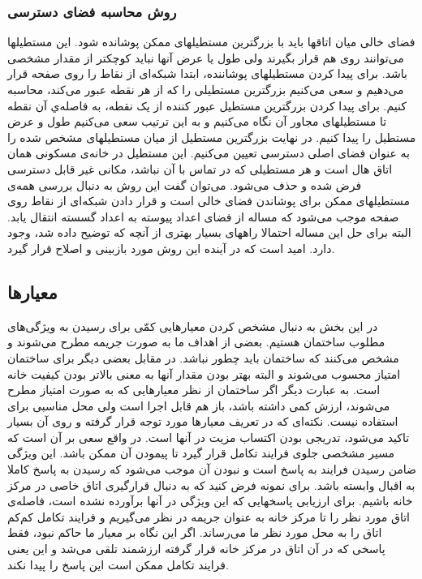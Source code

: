 \documentclass{report}
\begin{document}
\subsubsection{روش محاسبه فضای دسترسی}
فضای خالی میان اتاقها باید با بزرگترین مستطیلهای ممکن پوشانده شود. این مستطیلها می‌توانند روی هم قرار بگیرند ولی طول یا عرض آنها نباید کوچکتر از مقدار مشخصی باشد. برای پیدا کردن مستطیلهای پوشاننده، ابتدا شبکه‌ای از نقاط را روی صفحه قرار می‌دهیم و سعی می‌کنیم بزرگترین مستطیلی را که از هر نقطه عبور می‌کند، محاسبه کنیم. برای پیدا کردن بزرگترین مستطیل عبور کننده از یک نقطه، به فاصله‌ي آن نقطه تا مستطیلهای مجاور آن نگاه می‌کنیم و به این ترتیب سعی می‌کنیم طول و عرض مستطیل را پیدا کنیم.
در نهایت بزرگترین مستطیل از میان مستطیلهای مشخص شده را به عنوان فضای اصلی دسترسی تعیین می‌کنیم. این مستطیل در خانه‌ی مسکونی همان اتاق هال است و هر مستطیلی که در تماس با آن نباشد، مکانی غیر قابل دسترسی فرض شده و حذف می‌شود.
می‌توان گفت این روش به دنبال بررسی همه‌ی مستطیلهای ممکن برای پوشاندن فضای خالی است و قرار دادن شبکه‌ای از نقاط روی صفحه موجب می‌شود که مساله از فضای اعداد پیوسته به اعداد گسسته انتقال یابد. البته برای حل این مساله احتمالا راههای بسیار بهتری از آنچه که توضیح داده شد، وجود دارد. امید است که در آینده این روش مورد بازبینی و اصلاح قرار گیرد.

\subsection{معیارها}
در این بخش به دنبال مشخص کردن معیارهایی کمّی برای رسیدن به ویژگی‌های مطلوب ساختمان هستیم. بعضی از اهداف ما به صورت جریمه مطرح می‌شوند و مشخص می‌کنند که ساختمان باید چطور نباشد. در مقابل بعضی دیگر برای ساختمان امتیاز محسوب می‌شوند و البته بهتر بودن مقدار آنها به معنی بالاتر بودن کیفیت خانه است. به عبارت دیگر اگر ساختمان از نظر معیارهایی که به صورت امتیاز مطرح می‌شوند، ارزش کمی داشته باشد، باز هم قابل اجرا است ولی محل مناسبی برای استفاده نیست.
نکته‌ای که در تعریف معیارها مورد توجه قرار گرفته و روی آن بسیار تاکید می‌شود، تدریجی بودن اکتساب مزیت در آنها است. در واقع سعی بر آن است که مسیر مشخصی جلوی فرایند تکامل قرار گیرد تا پیمودن آن ممکن باشد. این ویژگی ضامن رسیدن فرایند به پاسخ است و نبودن آن موجب می‌شود که رسیدن به پاسخ کاملا به اقبال وابسته باشد. برای نمونه فرض کنید که به دنبال قرارگیری اتاق خاصی در مرکز خانه باشیم. برای ارزیابی پاسخهایی که این ویژگی در آنها برآورده نشده است، فاصله‌ی اتاق مورد نظر را تا مرکز خانه به عنوان جریمه در نظر می‌گیریم و فرایند تکامل کم‌کم اتاق را به محل مورد نظر ما می‌رساند. اگر این نگاه بر معیار ما حاکم نبود، فقط پاسخی که در آن اتاق در مرکز خانه قرار گرفته ارزشمند تلقی می‌شد و این یعنی فرایند تکامل ممکن است این پاسخ را پیدا نکند.
\end{document}
